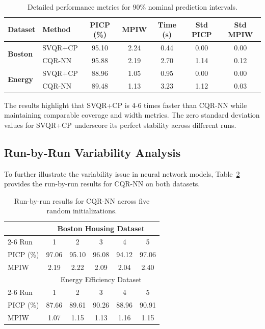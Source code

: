 \documentclass{article}
\begin{document}
\begin{table}[ht]
  \centering
  \caption{Detailed performance metrics for 90\% nominal prediction intervals.}
  \label{tab:detailed_metrics}
  \begin{tabular}{llccccc}
    \toprule
    Dataset & Method & PICP (\%) & MPIW & Time (s) & Std PICP & Std MPIW \\
    \midrule
    \multirow{2}{*}{\textbf{Boston}} & SVQR+CP & 95.10 & 2.24 & 0.44 & 0.00 & 0.00 \\
     & CQR-NN & 95.88 & 2.19 & 2.70 & 1.14 & 0.12 \\
    \midrule
    \multirow{2}{*}{\textbf{Energy}} & SVQR+CP & 88.96 & 1.05 & 0.95 & 0.00 & 0.00 \\
     & CQR-NN & 89.48 & 1.13 & 3.23 & 1.12 & 0.03 \\
    \bottomrule
  \end{tabular}
\end{table}

The results highlight that SVQR+CP is 4-6 times faster than CQR-NN while maintaining comparable coverage and width metrics. The zero standard deviation values for SVQR+CP underscore its perfect stability across different runs.

\subsection{Run-by-Run Variability Analysis}

To further illustrate the variability issue in neural network models, Table~\ref{tab:run_by_run} provides the run-by-run results for CQR-NN on both datasets.

\begin{table}[ht]
  \centering
  \caption{Run-by-run results for CQR-NN across five random initializations.}
  \label{tab:run_by_run}
  \begin{tabular}{lccccc}
    \toprule
    & \multicolumn{5}{c}{Boston Housing Dataset} \\
    \cmidrule(lr){2-6}
    Run & 1 & 2 & 3 & 4 & 5 \\
    \midrule
    PICP (\%) & 97.06 & 95.10 & 96.08 & 94.12 & 97.06 \\
    MPIW & 2.19 & 2.22 & 2.09 & 2.04 & 2.40 \\
    \midrule
    & \multicolumn{5}{c}{Energy Efficiency Dataset} \\
    \cmidrule(lr){2-6}
    Run & 1 & 2 & 3 & 4 & 5 \\
    \midrule
    PICP (\%) & 87.66 & 89.61 & 90.26 & 88.96 & 90.91 \\
    MPIW & 1.07 & 1.15 & 1.13 & 1.16 & 1.15 \\
    \bottomrule
  \end{tabular}
\end{table}
\end{document}

